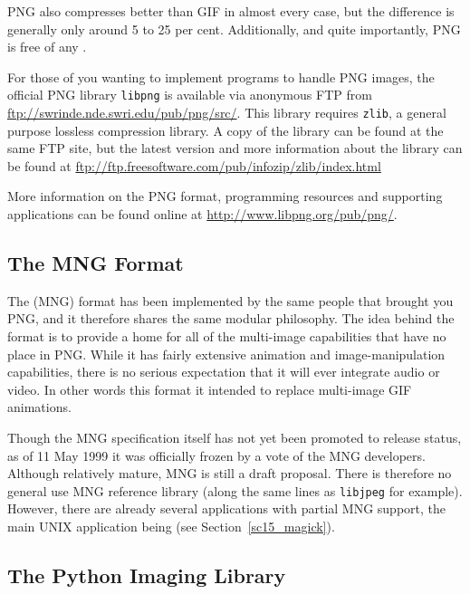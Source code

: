 \documentclass[twoside,11pt]{starlink}
\begin{document}
PNG also compresses better than GIF in almost every case, but the
difference is generally only around 5 to 25 per cent. Additionally,
and quite importantly, PNG is free of any .

For those of you wanting to implement programs to handle PNG images,
the official PNG library \texttt{libpng} is available via anonymous FTP
from \url{ftp://swrinde.nde.swri.edu/pub/png/src/}.
This library requires \texttt{zlib}, a general purpose lossless
compression library. A copy of the library can be found at the same
FTP site, but the latest version and more information about the
library can be found at \url{ftp://ftp.freesoftware.com/pub/infozip/zlib/index.html}

More information on the PNG format, programming resources and
supporting applications can be found online at \url{http://www.libpng.org/pub/png/}.

\subsection{The MNG Format\label{sc15_mng}}

The  (MNG) format has been
implemented by the same people that brought you PNG, and it therefore
shares the same modular philosophy. The idea behind the format is to
provide a home for all of the multi-image capabilities that have no
place in PNG. While it has fairly extensive animation and
image-manipulation capabilities, there is no serious expectation that
it will ever integrate audio or video. In other words this format it
intended to replace multi-image GIF animations.

Though the MNG specification itself has not yet been promoted to
release status, as of 11 May 1999 it was officially frozen by a vote
of the MNG developers. Although relatively mature, MNG is still a
draft proposal. There is therefore no general use MNG reference
library (along the same lines as \texttt{libjpeg} for example). However,
there are already several applications with partial MNG support, the
main UNIX application being 
(see Section~\ref{sc15_magick}).

\subsection{The Python Imaging Library\label{sc15_pythonimg}}
\end{document}
